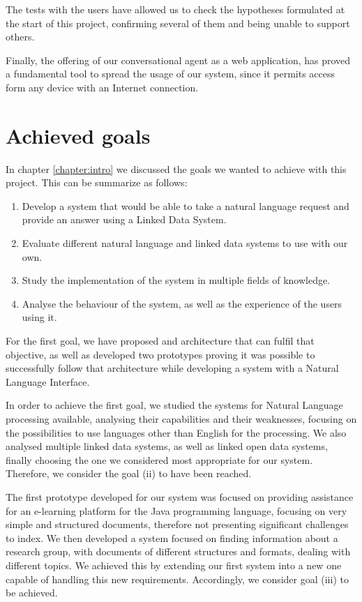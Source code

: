 The tests with the users have allowed us to check the hypotheses formulated at the start of this project, confirming several of them and being unable to support others.

Finally, the offering of our conversational agent as a web application, has proved a fundamental tool to spread the usage of our system, since it permits access form any device with an Internet connection.

\section{Achieved goals}

In chapter \ref{chapter:intro} we discussed the goals we wanted to achieve with this project. This can be summarize as follows:

\begin{enumerate}[label=(\roman*)]
 \item Develop a system that would be able to take a natural language request and provide an answer using a Linked Data System.
 \item Evaluate different natural language and linked data systems to use with our own.
 \item Study the implementation of the system in multiple fields of knowledge.
 \item Analyse the behaviour of the system, as well as the experience of the users using it.
\end{enumerate}

For the first goal, we have proposed and architecture that can fulfil that objective, as well as developed two prototypes proving it was possible to successfully follow that architecture while developing a system with a Natural Language Interface.

In order to achieve the first goal, we studied the systems for Natural Language processing available, analysing their capabilities and their weaknesses, focusing on the possibilities to use languages other than English for the processing. We also analysed multiple linked data systems, as well as linked open data systems, finally choosing the one we considered most appropriate for our system. Therefore, we consider the goal (ii) to have been reached.

The first prototype developed for our system was focused on providing assistance for an e-learning platform for the Java programming language, focusing on very simple and structured documents, therefore not presenting significant challenges to index. We then developed a system focused on finding information about a research group, with documents of different structures and formats, dealing with different topics. We achieved this by extending our first system into a new one capable of handling this new requirements. Accordingly, we consider goal (iii) to be achieved.

